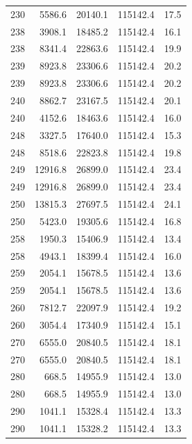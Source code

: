 \begin{longtable}{rrrrr}
    230 & \num{5586.6} & \num{20140.1} & \num{115142.4} & 17.5 \\
    238 & \num{3908.1} & \num{18485.2} & \num{115142.4} & 16.1 \\
    238 & \num{8341.4} & \num{22863.6} & \num{115142.4} & 19.9 \\
    239 & \num{8923.8} & \num{23306.6} & \num{115142.4} & 20.2 \\
    239 & \num{8923.8} & \num{23306.6} & \num{115142.4} & 20.2 \\
    240 & \num{8862.7} & \num{23167.5} & \num{115142.4} & 20.1 \\
    240 & \num{4152.6} & \num{18463.6} & \num{115142.4} & 16.0 \\
    248 & \num{3327.5} & \num{17640.0} & \num{115142.4} & 15.3 \\
    248 & \num{8518.6} & \num{22823.8} & \num{115142.4} & 19.8 \\
    249 & \num{12916.8} & \num{26899.0} & \num{115142.4} & 23.4 \\
    249 & \num{12916.8} & \num{26899.0} & \num{115142.4} & 23.4 \\
    250 & \num{13815.3} & \num{27697.5} & \num{115142.4} & 24.1 \\
    250 & \num{5423.0} & \num{19305.6} & \num{115142.4} & 16.8 \\
    258 & \num{1950.3} & \num{15406.9} & \num{115142.4} & 13.4 \\
    258 & \num{4943.1} & \num{18399.4} & \num{115142.4} & 16.0 \\
    259 & \num{2054.1} & \num{15678.5} & \num{115142.4} & 13.6 \\
    259 & \num{2054.1} & \num{15678.5} & \num{115142.4} & 13.6 \\
    260 & \num{7812.7} & \num{22097.9} & \num{115142.4} & 19.2 \\
    260 & \num{3054.4} & \num{17340.9} & \num{115142.4} & 15.1 \\
    270 & \num{6555.0} & \num{20840.5} & \num{115142.4} & 18.1 \\
    270 & \num{6555.0} & \num{20840.5} & \num{115142.4} & 18.1 \\
    280 & \num{668.5} & \num{14955.9} & \num{115142.4} & 13.0 \\
    280 & \num{668.5} & \num{14955.9} & \num{115142.4} & 13.0 \\
    290 & \num{1041.1} & \num{15328.4} & \num{115142.4} & 13.3 \\
    290 & \num{1041.1} & \num{15328.2} & \num{115142.4} & 13.3 \\

\end{longtable}

